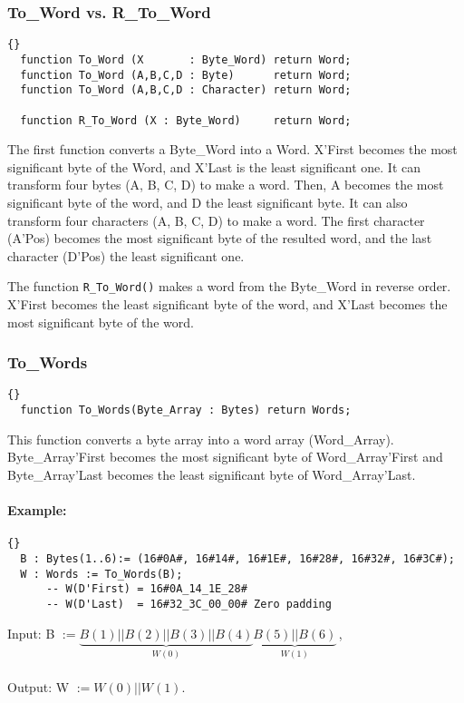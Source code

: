 \hhline
\subsubsection*{To\_Word vs. R\_To\_Word}
\begin{lstlisting}{}
  function To_Word (X       : Byte_Word) return Word;
  function To_Word (A,B,C,D : Byte)      return Word;
  function To_Word (A,B,C,D : Character) return Word;

  function R_To_Word (X : Byte_Word)     return Word;
\end{lstlisting}
The first function converts a Byte\_Word into a Word. X'First becomes
the most significant byte of the Word, and X'Last is the least
significant one.  It can transform four bytes (A, B, C, D) to make a
word. Then, A becomes the most significant byte of the word, and D the
least significant byte.  It can also transform four characters (A, B,
C, D) to make a word. The first character (A'Pos) becomes the most
significant byte of the resulted word, and the last character (D'Pos)
the least significant one.

The function \texttt{R\_To\_Word()} makes a word from the Byte\_Word
in reverse order. X'First becomes the least significant byte of the
word, and X'Last becomes the most significant byte of the
word.

\hhline
\subsubsection*{To\_Words}
\begin{lstlisting}{}
  function To_Words(Byte_Array : Bytes) return Words;
\end{lstlisting}
This function converts a byte array into a word array
(Word\_Array). Byte\_Array'First becomes the most significant byte of
Word\_Array'First and Byte\_Array'Last becomes the least significant
byte of Word\_Array'Last.

\paragraph{Example:}
\begin{lstlisting}{}
  B : Bytes(1..6):= (16#0A#, 16#14#, 16#1E#, 16#28#, 16#32#, 16#3C#);
  W : Words := To_Words(B);
      -- W(D'First) = 16#0A_14_1E_28#
      -- W(D'Last)  = 16#32_3C_00_00# Zero padding
\end{lstlisting}
Input: B $:=\underbrace{B(1)||B(2)||B(3)||B(4)}_{W(0)}
                    \underbrace{B(5)||B(6)}_{W(1)}$\,,\\ \ \\
Output: W $:=W(0)||W(1)$.

